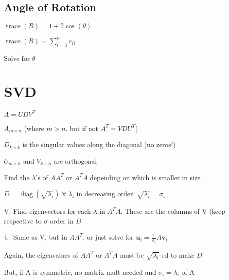 \documentclass[10pt,letterpaper]{article}
\newenvironment{tight_item}
{\begin{itemize}
\setlength{\parskip}{0pt}
\setlength{\parsep}{0pt}
\setlength{\itemsep}{0pt}
\setlength{\parsep}{0pt}
\setlength{\topsep}{0pt}
\setlength{\partopsep}{0pt}
\setlength{\leftmargin}{0em}
\setlength{\labelwidth}{0em}
\setlength{\labelsep}{0em} }
{\end{itemize}}
\newenvironment{tight_enum}
{\begin{enumerate}
\setlength{\parskip}{0pt}
\setlength{\parsep}{0pt}
\setlength{\itemsep}{0pt}
\setlength{\parsep}{0pt}
\setlength{\topsep}{0pt}
\setlength{\partopsep}{0pt}
\setlength{\leftmargin}{0em}
\setlength{\labelwidth}{0em}
\setlength{\labelsep}{0em} }
{\end{enumerate}}
\begin{document}
{\begin{multicols*}{5}
\subsection{Angle of Rotation}
\begin{center}
$\operatorname{trace}(R) = 1 + 2\cos(\theta)$
\end{center}
\begin{tight_item}
\item $\operatorname{trace}(R) = \sum_{i=1}^{n} r_{i i}$
\end{tight_item}
\begin{tight_enum}
\item Solve for $\theta$
\end{tight_enum}

\section{SVD}
\begin{center}
$A=UDV^{T}$
\end{center}
\begin{tight_item}
\item $A_{m \times n}$ (where $m > n$, but if not $A^{T}=VDU^{T}$)
\item $D_{k \times k}$ is the singular values along the diagonal (no zeros!)
\item $U_{m\times k}$ and $V_{k \times n}$ are orthogonal
\end{tight_item}
\begin{tight_enum}
\item Find the $\lambda$'s of $AA^{T}$ or $A^{T}A$ depending on which is smaller
in size
\item $D = \operatorname{diag}(\sqrt{\lambda_{i}}) \; \forall \; \lambda_{i}$ in
decreasing order. $\sqrt{\lambda_{i}} = \sigma_{i}$
\item V: Find eigenvectors for each $\lambda$ in $A^{T}A$. These are the columns
of V (keep respective to $\sigma$ order in $D$
\item U: Same as V, but in $AA^{T}$, or just solve for $\textbf{u}_{i} =
\frac{1}{\sigma_{i}} A \textbf{v}_{i}$
\end{tight_enum}
\begin{tight_item}
\item Again, the eigenvalues of $AA^{T}$ or $A^{T}A$ must be $\sqrt{\lambda_{i}}$-ed to
make $D$
\item But, if A is symmetric, no matrix mult needed and $\sigma_{i} =
\lambda_{i}$ of A
\end{tight_item}


\end{multicols*}}
\end{document}

